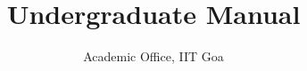 \documentclass[a4paper]{extarticle}
\title{Undergraduate Manual}
\author{Academic Office, IIT Goa}
\begin{document}
\begin{sloppypar}
	


\frontmatter




\tableofcontents

\pagebreak

\mainmatter










\end{sloppypar}


\printindex
\end{document}

